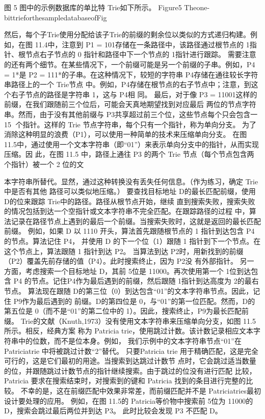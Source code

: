 图 5 图中的示例数据库的单比特 Trie如下所示。
Figure5 Theone-bittrieforthesampledatabaseofFig


       然后，每个子Trie使用分配给该子Trie的前缀的剩余位以类似的方式递归构建。例如，在图
   11.4中，注意到 P1 = 101存储在一条路径中，该路径通过根节点的 1指针、根节点右子节点的 0
指针和路径中下一个节点的 1指针进行跟踪。
需要注意的还有两个细节。在某些情况下，一个前缀可能是另一个前缀的子串。例如，P4 = 1*是
P2 = 111*的子串。在这种情况下，较短的字符串 P4存储在通往较长字符串路径上的一个 Trie节点
中。例如，P4存储在根节点的右子节点中；注意，到这个右子节点的路径是字符串 1，这与 P4相
同。
最后，对于像 P3 = 11001这样的前缀，在我们跟随前三个位后，可能会天真地期望找到对应最后
两位的节点字符串。然而，由于没有其他前缀与 P3共享超过前三个位，这些节点每个只会包含一
                                                    15
个指针。这样的 Trie 节点字符串，每个只有一个指针，称为单向分支。
为了消除这种明显的浪费（P1），可以使用一种简单的技术来压缩单向分支。
在图 11.5中，通过使用一个文本字符串（即“01”）来表示单向分支中的指针，从而实现压缩。因
此，在图 11.5 中，路径上通往 P3 的两个 Trie 节点（每个节点包含两个指针）被一个 2 位的文



本字符串所替代。显然，通过这种转换没有丢失任何信息。（作为练习，确定 Trie 中是否有其他
路径可以类似地压缩。）
要查找目标地址 D的最长匹配前缀，使用 D的位来跟踪 Trie中的路径。路径从根节点开始，继续
直到搜索失败，搜索失败的情况包括到达一个空指针或文本字符串不完全匹配。在跟踪路径的过程
中，算法记录在路径节点上遇到的最后一个前缀。当搜索失败时，这就是返回的最长匹配前缀。
例如，如果 D 以 1110 开头，算法首先跟随根节点的 1 指针到达包含 P4 的节点。算法记住 P4，
并使用 D 的下一个位（1）跟随 1 指针到下一个节点。在这个节点上，算法跟随 1 指针到达 P2。
当算法到达 P2时，用新找到的前缀（P2）覆盖先前存储的值（P4）。此时搜索终止，因为 P2没
有外部指针。
另一方面，考虑搜索一个目标地址 D，其前 5位是 11000。再次使用第一个 1位到达包含 P4
的节点。记住P4作为最后遇到的前缀，然后跟随 1指针到达高度为 2的最右节点。
算法现在跟随 D的第三位（0）到达包含“01”的文本字符串节点。因此，记住 P9作为最后遇到的
前缀。D的第四位是 0，与“01”的第一位匹配。然而，D的第五位是 0（而不是“01”的第二位中的
1）。因此，搜索终止，P9为最长匹配前缀。
Trie的文献（Knuth,1973）没有使用文本字符串来压缩单向分支，如图 11.5所示。相反，经典方案
称为 Patricia trie，使用跳过计数。该计数记录相应文本字符串中的位数，而不是位本身。例如，
我们示例中的文本字符串节点“01”在 Patriciatrie 中将被跳过计数“2”替代。
只要Patricia trie 用于精确匹配，这是完全可行的，这是它们最初的用途。当搜索到达跳过计数节
点时，它会跳过适当数量的位，并跟随跳过计数节点的指针继续搜索。由于跳过的位没有进行匹配
比较，Patricia 要求在搜索结束时，对搜索到的键和 Patricia 找到的条目进行完整的比较。
不幸的是，这在前缀匹配中效果非常差，而前缀匹配并不是 Patriciatries最初设计要处理的应用。
例如，在图 11.5的 Patricia等价物中搜索前 5位为 11000的 D，搜索会跳过最后两位并到达 P3。
此时比较会发现 P3 不匹配 D。


